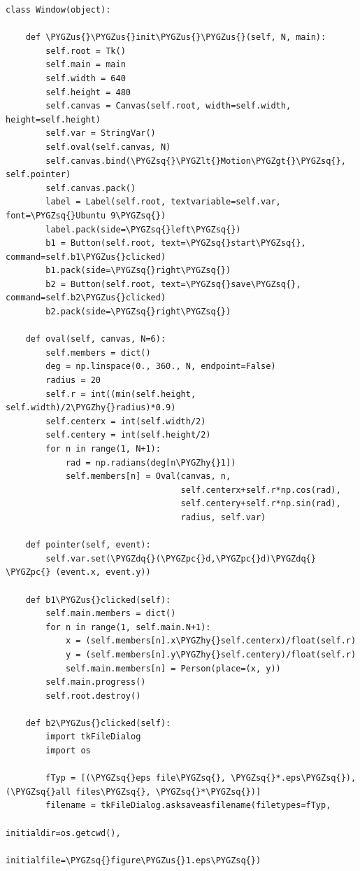 \documentclass[letterpaper,10pt,english]{sphinxmanual}
\def\PYGZus{\char`\_}
\def\PYGZlt{\char`\<}
\def\PYGZgt{\char`\>}
\def\PYGZpc{\char`\%}
\def\PYGZhy{\char`\-}
\def\PYGZsq{\char`\'}
\def\PYGZdq{\char`\"}
\begin{document}
\begin{Verbatim}[commandchars=\\\{\}]
class Window(object):

    def \PYGZus{}\PYGZus{}init\PYGZus{}\PYGZus{}(self, N, main):
        self.root = Tk()
        self.main = main
        self.width = 640
        self.height = 480
        self.canvas = Canvas(self.root, width=self.width, height=self.height)
        self.var = StringVar()
        self.oval(self.canvas, N)
        self.canvas.bind(\PYGZsq{}\PYGZlt{}Motion\PYGZgt{}\PYGZsq{}, self.pointer)
        self.canvas.pack()
        label = Label(self.root, textvariable=self.var, font=\PYGZsq{}Ubuntu 9\PYGZsq{})
        label.pack(side=\PYGZsq{}left\PYGZsq{})
        b1 = Button(self.root, text=\PYGZsq{}start\PYGZsq{}, command=self.b1\PYGZus{}clicked)
        b1.pack(side=\PYGZsq{}right\PYGZsq{})
        b2 = Button(self.root, text=\PYGZsq{}save\PYGZsq{}, command=self.b2\PYGZus{}clicked)
        b2.pack(side=\PYGZsq{}right\PYGZsq{})

    def oval(self, canvas, N=6):
        self.members = dict()
        deg = np.linspace(0., 360., N, endpoint=False)
        radius = 20
        self.r = int((min(self.height, self.width)/2\PYGZhy{}radius)*0.9)
        self.centerx = int(self.width/2)
        self.centery = int(self.height/2)
        for n in range(1, N+1):
            rad = np.radians(deg[n\PYGZhy{}1])
            self.members[n] = Oval(canvas, n,
                                   self.centerx+self.r*np.cos(rad),
                                   self.centery+self.r*np.sin(rad),
                                   radius, self.var)

    def pointer(self, event):
        self.var.set(\PYGZdq{}(\PYGZpc{}d,\PYGZpc{}d)\PYGZdq{} \PYGZpc{} (event.x, event.y))

    def b1\PYGZus{}clicked(self):
        self.main.members = dict()
        for n in range(1, self.main.N+1):
            x = (self.members[n].x\PYGZhy{}self.centerx)/float(self.r)
            y = (self.members[n].y\PYGZhy{}self.centery)/float(self.r)
            self.main.members[n] = Person(place=(x, y))
        self.main.progress()
        self.root.destroy()

    def b2\PYGZus{}clicked(self):
        import tkFileDialog
        import os

        fTyp = [(\PYGZsq{}eps file\PYGZsq{}, \PYGZsq{}*.eps\PYGZsq{}), (\PYGZsq{}all files\PYGZsq{}, \PYGZsq{}*\PYGZsq{})]
        filename = tkFileDialog.asksaveasfilename(filetypes=fTyp,
                                                  initialdir=os.getcwd(),
                                                  initialfile=\PYGZsq{}figure\PYGZus{}1.eps\PYGZsq{})


\end{Verbatim}
\end{document}
